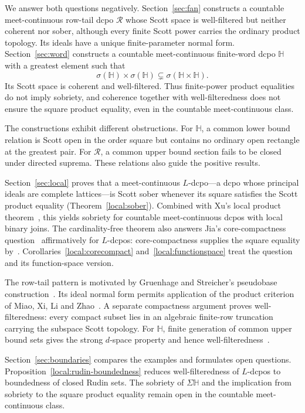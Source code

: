 \documentclass[fleqn,preprint,3p,a4paper]{elsarticle}
\theoremstyle{definition}
\newcommand{\HH}{\mathbb H}
\newcommand{\RR}{\mathcal R}
\begin{document}
We answer both questions negatively. Section~\ref{sec:fan} constructs a countable meet-continuous row-tail dcpo $\RR$ whose Scott space is well-filtered but neither coherent nor sober, although every finite Scott power carries the ordinary product topology. Its ideals have a unique finite-parameter normal form. Section~\ref{sec:word} constructs a countable meet-continuous finite-word dcpo $\HH$ with a greatest element such that
\[
 \sigma(\HH)\times\sigma(\HH)\subsetneq\sigma(\HH\times\HH).
\]
Its Scott space is coherent and well-filtered. Thus finite-power product equalities do not imply sobriety, and coherence together with well-filteredness does not ensure the square product equality, even in the countable meet-continuous class.

The constructions exhibit different obstructions. For $\HH$, a common lower bound relation is Scott open in the order square but contains no ordinary open rectangle at the greatest pair. For $\RR$, a common upper bound section fails to be closed under directed suprema. These relations also guide the positive results.

Section~\ref{sec:local} proves that a meet-continuous $L$-dcpo---a dcpo whose principal ideals are complete lattices---is Scott sober whenever its square satisfies the Scott product equality (Theorem~\ref{local:sober}). Combined with Xu's local product theorem~\cite[Theorem~3.4]{Xu}, this yields sobriety for countable meet-continuous dcpos with local binary joins. The cardinality-free theorem also answers Jia's core-compactness question~\cite[Question~4.5.8, p.~139]{Jia} affirmatively for $L$-dcpos: core-compactness supplies the square equality by~\cite[Theorem~II-4.13]{GHK}. Corollaries~\ref{local:corecompact} and~\ref{local:functionspace} treat the question and its function-space version.

The row-tail pattern is motivated by Gruenhage and Streicher's pseudobase construction~\cite[pp.~225--226]{GS}. Its ideal normal form permits application of the product criterion of Miao, Xi, Li and Zhao~\cite[Lemma~4.1, pp.~827--829]{MXLZ}. A separate compactness argument proves well-filteredness: every compact subset lies in an algebraic finite-row truncation carrying the subspace Scott topology. For $\HH$, finite generation of common upper bound sets gives the strong $d$-space property and hence well-filteredness~\cite[Corollary~64]{LXLower}.

Section~\ref{sec:boundaries} compares the examples and formulates open questions. Proposition~\ref{local:rudin-boundedness} reduces well-filteredness of $L$-dcpos to boundedness of closed Rudin sets. The sobriety of $\Sigma\HH$ and the implication from sobriety to the square product equality remain open in the countable meet-continuous class.
\end{document}
